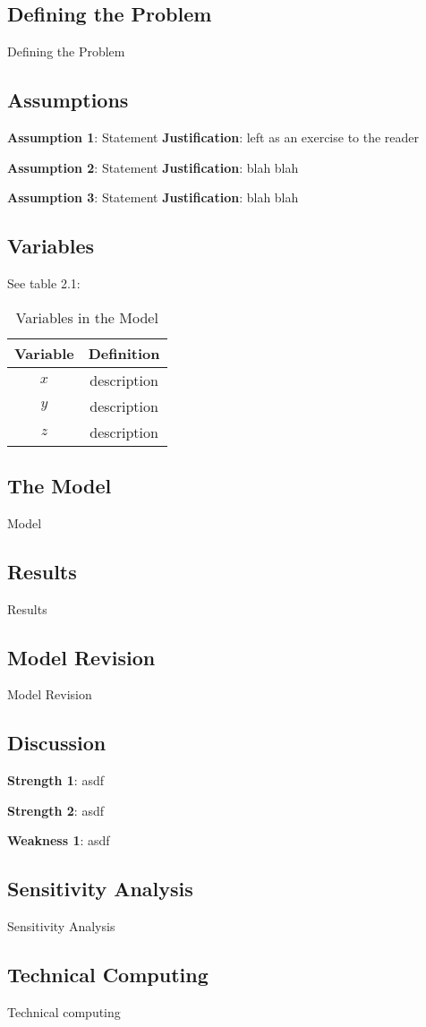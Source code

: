 \subsection{Defining the Problem}
Defining the Problem

\subsection{Assumptions}
\noindent\textbf{Assumption 1}: Statement
\textbf{Justification}: left as an exercise to the reader

\noindent\textbf{Assumption 2}: Statement
\textbf{Justification}: blah blah

\noindent\textbf{Assumption 3}: Statement
\textbf{Justification}: blah blah

\subsection{Variables}
See table 2.1:
\begin{table}[h!]
    \centering
    \begin{tabular}{cc}
        \toprule
        Variable & Definition      \\
        \midrule
        $x$      & description     \\
        $y$      & description     \\
        $z$      & description     \\
        \bottomrule
    \end{tabular}
    \caption{Variables in the Model}
    \label{tab:my_label}
\end{table}

\subsection{The Model}
Model

\subsection{Results}
Results

\subsection{Model Revision}
Model Revision

\subsection{Discussion}

\noindent\textbf{Strength 1}: asdf

\noindent\textbf{Strength 2}: asdf

\noindent\textbf{Weakness 1}: asdf

\subsection{Sensitivity Analysis}
Sensitivity Analysis

\subsection{Technical Computing}
Technical computing


\newpage
